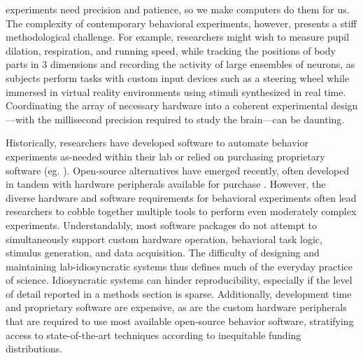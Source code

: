 
 experiments need precision and patience, so we make computers do them for us. The complexity of contemporary behavioral experiments, however, presents a stiff methodological challenge. For example, researchers might wish to measure pupil dilation\citep{reimerPupilFluctuationsTrack2016}, respiration\citep{parabuckiOdorConcentrationChange2019}, and running speed\citep{niellModulationVisualResponses2010}, while tracking the positions of body parts in 3 dimensions\citep{nathUsingDeepLabCut3D2019} and recording the activity of large ensembles of neurons\citep{junFullyIntegratedSilicon2017}, as subjects perform tasks with custom input devices such as a steering wheel\citep{burgessHighYieldMethodsAccurate2017} while immersed in virtual reality environments using stimuli synthesized in real time\citep{thurleyVirtualRealitySystems2017,chambersOnlineStimulusOptimization2014}. Coordinating the array of necessary hardware into a coherent experimental design---with the millisecond precision required to study the brain---can be daunting.

Historically, researchers have developed software to automate behavior experiments as-needed within their lab or relied on purchasing proprietary software (eg. \citep{elliottNationalInstrumentsLabVIEW2007}). Open-source alternatives have emerged recently, often developed in tandem with hardware peripherals available for purchase \citep{ephysPyControl2019,sandersSanworksBPod}. However, the diverse hardware and software requirements for behavioral experiments often lead researchers to cobble together multiple tools to perform even moderately complex experiments. Understandably, most software packages do not attempt to simultaneously support custom hardware operation, behavioral task logic, stimulus generation, and data acquisition. The difficulty of designing and maintaining lab-idiosyncratic systems thus defines much of the everyday practice of science. Idiosyncratic systems can hinder reproducibility, especially if the level of detail reported in a methods section is sparse\citep{wallReliabilityStartsExperimental2019}. Additionally, development time and proprietary software are expensive, as are the custom hardware peripherals that are required to use most available open-source behavior software, stratifying access to state-of-the-art techniques according to inequitable funding distributions.

